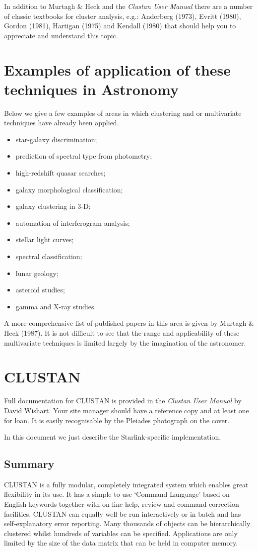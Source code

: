 In addition to Murtagh \& Heck and the {\it Clustan User Manual}
there are a number of classic textbooks for cluster analysis, e.g.: Anderberg
(1973), Evritt (1980), Gordon (1981), Hartigan (1975) and Kendall (1980)
that should help you to appreciate and understand this topic.

\section{Examples of application of these techniques in Astronomy}

Below we give a few examples of areas in which clustering and\/ or multivariate
techniques have already been applied.

\begin{itemize}
\item star-galaxy discrimination;
\item prediction of spectral type from photometry;
\item high-redshift quasar searches;
\item galaxy morphological classification;
\item galaxy clustering in 3-D;
\item automation of interferogram analysis;
\item stellar light curves;
\item spectral classification;
\item lunar geology;
\item asteroid studies;
\item gamma and X-ray studies.
\end{itemize}

A more comprehensive list of published papers in this area is given by
Murtagh \& Heck (1987). It is not difficult to see that the range and
applicability of these multivariate techniques is limited largely by the
imagination of the astronomer.

\section{CLUSTAN}
Full documentation for {\small CLUSTAN} is provided in the {\it Clustan
User Manual} by David Wishart.  Your site manager should have a
reference copy and at least one for loan.  It is easily recognisable by
the Pleiades photograph on the cover.

In this document we just describe the Starlink-specific implementation.

\subsection{Summary}
{\small CLUSTAN} is a fully modular, completely integrated system which
enables great flexibility in its use. It has a simple to use `Command
Language' based on English keywords together with on-line help, review
and command-correction facilities. {\small CLUSTAN} can equally well be
run interactively or in batch and has self-explanatory error reporting.
Many thousands of objects can be hierarchically clustered whilst
hundreds of variables can be specified. Applications are only limited by
the size of the data matrix that can be held in computer memory.

